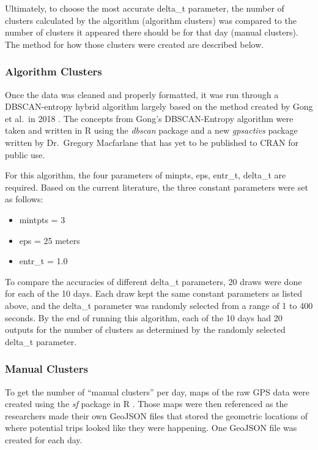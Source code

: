 \documentclass[3p, authoryear]{elsarticle} %
\begin{document}
Ultimately, to choose the most accurate delta\_t parameter, the number of clusters calculated by the algorithm (algorithm clusters) was compared to the number of clusters it appeared there should be for that day (manual clusters). The method for how those clusters were created are described below.

\hypertarget{algorithm-clusters}{%
\subsubsection{Algorithm Clusters}\label{algorithm-clusters}}

Once the data was cleaned and properly formatted, it was run through a DBSCAN-entropy hybrid algorithm largely based on the method created by Gong et al.~in 2018 \citep{GongInspiration}. The concepts from Gong's DBSCAN-Entropy algorithm were taken and written in R using the \emph{dbscan} package \citep{dbscanR} and a new \emph{gpsactivs} package written by Dr.~Gregory Macfarlane that has yet to be published to CRAN for public use.

For this algorithm, the four parameters of minpts, eps, entr\_t, delta\_t are required. Based on the current literature, the three constant parameters were set as follows:

\begin{itemize}
\item
  mintpts = 3
\item
  eps = 25 meters
\item
  entr\_t = 1.0
\end{itemize}

To compare the accuracies of different delta\_t parameters, 20 draws were done for each of the 10 days. Each draw kept the same constant parameters as listed above, and the delta\_t parameter was randomly selected from a range of 1 to 400 seconds. By the end of running this algorithm, each of the 10 days had 20 outputs for the number of clusters as determined by the randomly selected delta\_t parameter.

\hypertarget{manual-clusters}{%
\subsubsection{Manual Clusters}\label{manual-clusters}}

To get the number of ``manual clusters'' per day, maps of the raw GPS data were created using the \emph{sf} package in R \citep{sfR}. Those maps were then referenced as the researchers made their own GeoJSON files that stored the geometric locations of where potential trips looked like they were happening. One GeoJSON file was created for each day.
\end{document}
